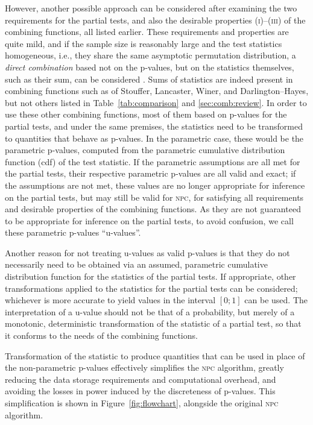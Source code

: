 However, another possible approach can be considered after examining the two requirements for the partial tests, and also the desirable properties (\textsc{i})--(\textsc{iii}) of the combining functions, all listed earlier. These requirements and properties are quite mild, and if the sample size is reasonably large and the test statistics homogeneous, i.e., they share the same asymptotic permutation distribution, a \emph{direct combination} based not on the p-values, but on the statistics themselves, such as their sum, can be considered \citep[page 131]{Pesarin2010}. Sums of statistics are indeed present in combining functions such as of Stouffer, Lancaster, Winer, and Darlington--Hayes, but not others listed in Table~\ref{tab:comparison} and \ref{sec:comb:review}. In order to use these other combining functions, most of them based on p-values for the partial tests, and under the same premises, the statistics need to be transformed to quantities that behave as p-values. In the parametric case, these would be the parametric p-values, computed from the parametric cumulative distribution function (cdf) of the test statistic. If the parametric assumptions are all met for the partial tests, their respective parametric p-values are all valid and exact; if the assumptions are not met, these values are no longer appropriate for inference on the partial tests, but may still be valid for \textsc{npc}, for satisfying all requirements and desirable properties of the combining functions. As they are not guaranteed to be appropriate for inference on the partial tests, to avoid confusion, we call these parametric p-values ``u-values''.

Another reason for not treating u-values as valid p-values is that they do not necessarily need to be obtained via an assumed, parametric cumulative distribution function for the statistics of the partial tests. If appropriate, other transformations applied to the statistics for the partial tests can be considered; whichever is more accurate to yield values in the interval $[0;1]$ can be used. The interpretation of a u-value should not be that of a probability, but merely of a monotonic, deterministic transformation of the statistic of a partial test, so that it conforms to the needs of the combining functions.

Transformation of the statistic to produce quantities that can be used in place of the non-parametric p-values effectively simplifies the \textsc{npc} algorithm, greatly reducing the data storage requirements and computational overhead, and avoiding the losses in power induced by the discreteness of p-values. This simplification is shown in Figure~\ref{fig:flowchart}, alongside the original \textsc{npc} algorithm.

